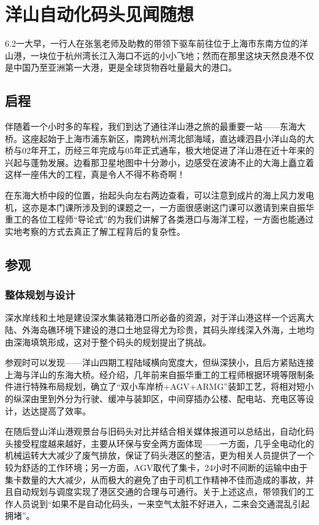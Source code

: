 \newpage
\section{洋山自动化码头见闻随想}

6.2一大早，一行人在张氢老师及助教的带领下驱车前往位于上海市东南方位的洋山港，一块位于杭州湾长江入海口不远的小小飞地；然而在那里这块天然良港不仅是中国乃至亚洲第一大港，更是全球货物吞吐量最大的港口。

\subsection{启程}

伴随着一个小时多的车程，我们到达了通往洋山港之旅的最重要一站——东海大桥。这座起始于上海市浦东新区，南跨杭州湾北部海域，直达嵊泗县小洋山岛的大桥与02年开工，历经三年完成与05年正式通车，极大地促进了洋山港在近十年来的兴起与蓬勃发展。边看那卫星地图中十分渺小，边感受在波涛不止的大海上矗立着这样一座伟大的工程，真是令人不得不称奇啊！

在东海大桥中段的位置，抬起头向左右两边查看，可以注意到成片的海上风力发电机，这亦是本门课所涉及到的课题之一，一方面很感谢这门课可以邀请到来自振华重工的各位工程师“导论式”的为我们讲解了各类港口与海洋工程，一方面也能通过实地考察的方式去真正了解工程背后的复杂性。

\subsection{参观}

\subsubsection{整体规划与设计}

深水岸线和土地是建设深水集装箱港口所必备的资源，对于洋山港这样一个远离大陆、外海岛礁环境下建设的港口土地显得尤为珍贵，其码头岸线深入外海，土地均由深海填筑形成，这对于整个码头的规划提出了挑战。

参观时可以发现——洋山四期工程陆域横向宽度大，但纵深狭小，且后方紧贴连接上海与洋山的东海大桥。经介绍，几年前来自振华重工的工程师根据环境等限制条件进行特殊布局规划，确立了“双小车岸桥+AGV+ARMG”装卸工艺，将相对短小的纵深由里到外分为行驶、缓冲与装卸区，中间穿插办公楼、配电站、充电区等设计，达达提高了效率。

在随后登山洋山港观景台与旧码头对比并结合相关媒体报道可以总结出，自动化码头接受程度越来越好，主要从环保与安全两方面体现——一方面，几乎全电动化的机械运转大大减少了废气排放，保证了码头港区的整洁，更为相关人员提供了一个较为舒适的工作环境；另一方面，AGV取代了集卡，24小时不间断的运输中由于集卡数量的大大减少，从而极大的避免了由于司机工作精神不佳而造成的事故，并且自动规划与调度实现了港区交通的合理与可通行。关于上述这点，带领我们的工作人员说到“如果不是自动化码头，一来空气太脏不好进入，二来会交通混乱引起拥堵”。

